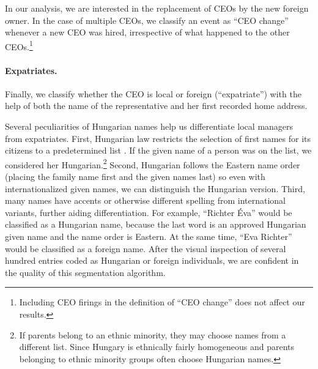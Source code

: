 \documentclass[12pt,a4paper]{article}
\begin{document}


In our analysis, we are interested in the replacement of CEOs by the new foreign owner. In the case of multiple CEOs, we classify an event as ``CEO change'' whenever a new CEO was hired, irrespective of what happened to the other CEOs.\footnote{Including CEO firings in the definition of ``CEO change'' does not affect our results.}

\paragraph{Expatriates.} Finally, we classify whether the CEO is local or foreign (``expatriate'') with the help of both the name of the representative and her first recorded home address. 

Several peculiarities of Hungarian names help us differentiate local managers from expatriates. First, Hungarian law restricts the selection of first names for its citizens to a predetermined list \citep{anyakonyv,nevlista}. If the given name of a person was on the list, we considered her Hungarian.\footnote{If parents belong to an ethnic minority, they may choose names from a different list. Since Hungary is ethnically fairly homogeneous and parents belonging to ethnic minority groups often choose Hungarian names.} Second, Hungarian follows the Eastern name order (placing the family name first and the given names last) so even with internationalized given names, we can distinguish the Hungarian version. Third, many names have accents or otherwise different spelling from international variants, further aiding differentiation. For example, ``Richter Éva'' would be classified as a Hungarian name, because the last word is an approved Hungarian given name and the name order is Eastern. At the same time, ``Eva Richter'' would be classified as a foreign name. After the visual inspection of several hundred entries coded as Hungarian or foreign individuals, we are confident in the quality of this segmentation algorithm.
\end{document}
